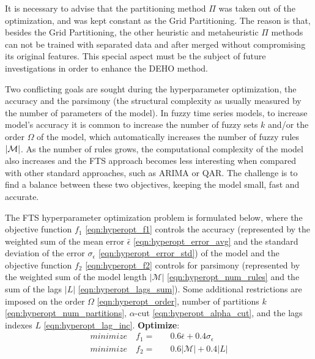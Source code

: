 It is necessary to advise that the partitioning method $\Pi$ was taken out of the optimization, and was kept constant as the Grid Partitioning. The reason is that, besides the Grid Partitioning, the other heuristic and metaheuristic $\Pi$ methods can not be trained with separated data and after merged without compromising its original features. This special aspect must be the subject of future investigations in order to enhance the DEHO method.

Two conflicting goals are sought during the hyperparameter optimization, the accuracy and the parsimony (the structural complexity as usually measured by the number of parameters of the model). In fuzzy time series models, to increase model's accuracy  it is common to increase the number of fuzzy sets $k$ and/or the order $\Omega$ of the model, which automatically increases the number of fuzzy rules $|\mathcal{M}|$. As the number of rules grows, the computational complexity of the model also increases and the FTS approach becomes less interesting when compared with other standard approaches, such as ARIMA or QAR. The challenge is to find a balance between these two objectives, keeping the model small, fast and accurate.

The FTS hyperparameter optimization problem is formulated below, where the objective function $f_1$ \eqref{eqn:hyperopt_f1} controls the accuracy (represented by the weighted sum of the mean error $\bar{\epsilon}$ \eqref{eqn:hyperopt_error_avg} and the standard deviation of the error $\sigma_\epsilon$ \eqref{eqn:hyperopt_error_std}) of the model and the objective function $f_2$ \eqref{eqn:hyperopt_f2} controls for parsimony (represented by the weighted sum of the model length $|\mathcal{M}|$ \eqref{eqn:hyperopt_num_rules} and the sum of the lags $|L|$ \eqref{eqn:hyperopt_lags_sum}). Some additional restrictions are imposed on the order $\Omega$ \eqref{eqn:hyperopt_order}, number of partitions $k$ \eqref{eqn:hyperopt_num_partitions}, $\alpha$-cut \eqref{eqn:hyperopt_alpha_cut}, and the lags indexes $L$ \eqref{eqn:hyperopt_lag_inc}. 
\textbf{Optimize}:
\begin{align}
minimize \quad  f_1  = & \quad 0.6\bar{\epsilon} + 0.4\sigma_\epsilon \label{eqn:hyperopt_f1}\\
minimize \quad  f_2  = & \quad 0.6|\mathcal{M}| + 0.4|L|  \label{eqn:hyperopt_f2}
\end{align}

